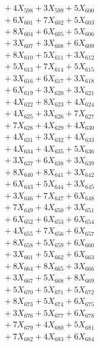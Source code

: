 \documentclass[a4paper,10pt]{article}
\begin{document}
{\begin{align}
&\;  + 4 X_{598} + 3 X_{599} + 5 X_{600} \\[0.3ex]
&\;  + 6 X_{601} + 7 X_{602} + 5 X_{603} \\[0.3ex]
&\;  + 8 X_{604} + 6 X_{605} + 5 X_{606} \\[0.3ex]
&\;  + 3 X_{607} + 3 X_{608} + 6 X_{609} \\[0.5ex]\allowbreak
&\;  + 8 X_{610} + 5 X_{611} + 3 X_{612} \\[0.3ex]
&\;  + 5 X_{613} + 7 X_{614} + 5 X_{615} \\[0.3ex]
&\;  + 3 X_{616} + 6 X_{617} + 3 X_{618} \\[0.3ex]
&\;  + 6 X_{619} + 3 X_{620} + 3 X_{621} \\[0.3ex]
&\;  + 4 X_{622} + 8 X_{623} + 4 X_{624} \\[0.3ex]
&\;  + 4 X_{625} + 3 X_{626} + 7 X_{627} \\[0.3ex]
&\;  + 7 X_{628} + 4 X_{629} + 4 X_{630} \\[0.3ex]
&\;  + 4 X_{631} + 3 X_{632} + 4 X_{633} \\[0.3ex]
&\;  + 4 X_{634} + 4 X_{635} + 5 X_{636} \\[0.3ex]
&\;  + 3 X_{637} + 6 X_{638} + 3 X_{639} \\[0.5ex]\allowbreak
&\;  + 8 X_{640} + 8 X_{641} + 3 X_{642} \\[0.3ex]
&\;  + 6 X_{643} + 5 X_{644} + 3 X_{645} \\[0.3ex]
&\;  + 3 X_{646} + 7 X_{647} + 6 X_{648} \\[0.3ex]
&\;  + 7 X_{649} + 4 X_{650} + 3 X_{651} \\[0.3ex]
&\;  + 6 X_{652} + 6 X_{653} + 6 X_{654} \\[0.3ex]
&\;  + 4 X_{655} + 7 X_{656} + 6 X_{657} \\[0.3ex]
&\;  + 8 X_{658} + 5 X_{659} + 6 X_{660} \\[0.3ex]
&\;  + 3 X_{661} + 5 X_{662} + 6 X_{663} \\[0.3ex]
&\;  + 8 X_{664} + 8 X_{665} + 3 X_{666} \\[0.3ex]
&\;  + 3 X_{667} + 5 X_{668} + 8 X_{669} \\[0.5ex]\allowbreak
&\;  + 5 X_{670} + 5 X_{671} + 5 X_{672} \\[0.3ex]
&\;  + 8 X_{673} + 5 X_{674} + 6 X_{675} \\[0.3ex]
&\;  + 3 X_{676} + 5 X_{677} + 6 X_{678} \\[0.3ex]
&\;  + 7 X_{679} + 4 X_{680} + 5 X_{681} \\[0.3ex]
&\;  + 7 X_{682} + 4 X_{683} + 6 X_{684} \\[0.3ex]

\end{align}}
\end{document}
